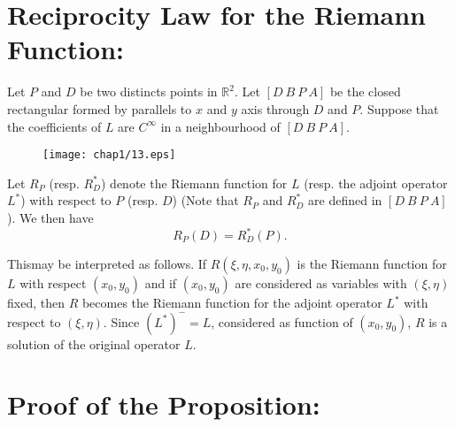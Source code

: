 \section*{Reciprocity Law for the Riemann Function:}

\begin{prop*}
Let $P$ and $D$ be two distincts points in $\mathbb{R}^{2}$. Let $[D \ B \ P \ A]$ be the closed rectangular formed by parallels to $x$ and $y$ axis through $D$ and $P$. Suppose that the coefficients of $L$ are $C^{\infty}$ in a neighbourhood of $[D \ B \ P \ A]$.
\begin{figure}[H]
\centering
\texttt{[image: chap1/13.eps]}
\end{figure}
\end{prop*}

Let $R_{P}$ (resp. $R^{*}_{D}$) denote the Riemann function for $L$ (resp. the adjoint operator $L^{*}$) with respect to $P$ (resp. $D$) (Note that $R_{P}$ and $R^{*}_{D}$ are defined in $[D \ B \ P \ A]$). We then have
$$
R_{P}(D)=R^{*}_{D}(P).
$$

\begin{remark*}
This\pageoriginale may be interpreted as follows. If $R(\xi, \eta, x_{0}, y_{0})$ is the Riemann function for $L$ with respect $(x_{0},y_{0})$ and if $(x_{0},y_{0})$ are considered as variables with $(\xi,\eta)$ fixed, then $R$ becomes the Riemann function for the adjoint operator $L^{*}$ with respect to $(\xi,\eta)$. Since $(L^{*})^{-}=L$, considered as function of $(x_{0},y_{0})$, $R$ is a solution of the original operator $L$.
\end{remark*}

\section*{Proof of the Proposition:}

